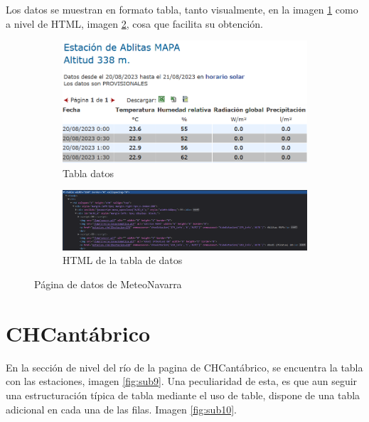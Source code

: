 Los datos se muestran en formato tabla, tanto visualmente, en la imagen \ref{fig:sub7} como a nivel de HTML, imagen \ref{fig:sub8}, cosa que facilita su obtención.

\begin{figure} [H]
	\centering
	\begin{subfigure}{.5\textwidth}
		\centering
		\includegraphics[width=.7\linewidth]{fig/MeteoNavarraData.png}
		\caption{Tabla datos}
		\label{fig:sub7}
	\end{subfigure}%
	\begin{subfigure}{.5\textwidth}
		\centering
		\includegraphics[width=.7\linewidth]{fig/MeteoNavarraCodeHTML.png}
		\caption{HTML de la tabla de datos}
		\label{fig:sub8}
	\end{subfigure}
	\caption{Página de datos de MeteoNavarra}
	\label{fig:ej29}
\end{figure}

\section{CHCantábrico}
En la sección de nivel del río de la pagina de CHCantábrico, se encuentra la tabla con las estaciones, imagen \ref{fig:sub9}. Una peculiaridad de esta, es que aun seguir una estructuración típica de tabla mediante el uso de table, dispone de una tabla adicional en cada una de las filas. Imagen \ref{fig:sub10}.

